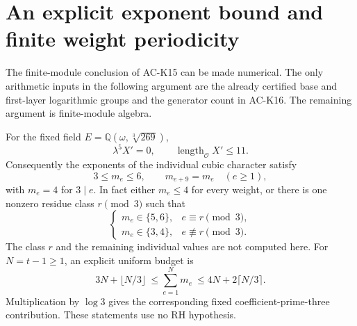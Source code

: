 \section{An explicit exponent bound and finite weight periodicity}
\label{sec:cubic-uniform-explicit}

The finite-module conclusion of AC-K15 can be made numerical.
The only arithmetic inputs in the following argument are the
already certified base and first-layer logarithmic groups and
the generator count in AC-K16.  The remaining argument is
finite-module algebra.

\begin{theorem}
\label{AC-K18}
For the fixed field $E=\mathbb Q(\omega,\sqrt[3]{269})$,
\[
 \lambda^5X'=0,\qquad
 \operatorname{length}_{\mathcal O}X'\leq11.           \tag{KE.1}
\]
Consequently the exponents of the individual cubic character
satisfy
\[
        3\leq m_e\leq6,\qquad m_{e+9}=m_e
                  \quad(e\geq1),                    \tag{KE.2}
\]
with $m_e=4$ for $3\mid e$.
In fact either $m_e\leq4$ for every weight, or there is one
nonzero residue class $r\pmod3$ such that
\[
 \begin{cases}
 m_e\in\{5,6\},&e\equiv r\pmod3,\\
 m_e\in\{3,4\},&e\not\equiv r\pmod3.
 \end{cases}                                         \tag{KE.3}
\]
The class $r$ and the remaining individual values are not
computed here.  For $N=t-1\geq1$, an explicit uniform budget is
\[
 3N+\lfloor N/3\rfloor
 \ \leq\sum_{e=1}^{N}m_e
 \ \leq 4N+2\lceil N/3\rceil.                       \tag{KE.4}
\]
Multiplication by $\log3$ gives the corresponding fixed
coefficient-prime-three contribution.  These statements use
no RH hypothesis.
\end{theorem}
